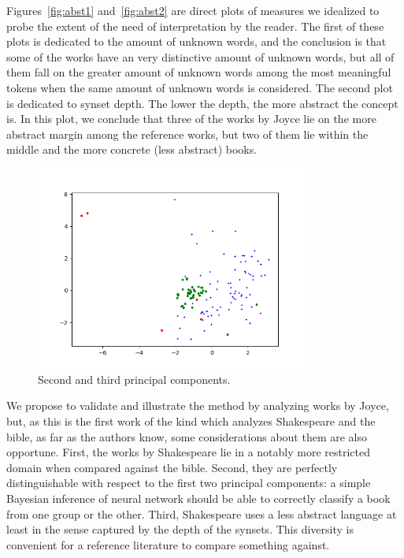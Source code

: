 \documentclass[12pt,fleqn]{article}
\begin{document}
Figures~\ref{fig:abst1} and~\ref{fig:abst2} are direct plots of measures
we idealized to probe the extent of the need of interpretation by the reader.
The first of these plots is dedicated to the amount of unknown words,
and the conclusion is that some of the works have an very distinctive amount
of unknown words, but all of them fall on the greater amount of unknown words
among the most meaningful tokens when the same amount of unknown words is considered.
The second plot is dedicated to synset depth.
The lower the depth, the more abstract the concept is.
In this plot, we conclude that three of the works by Joyce lie on
the more abstract margin among the reference works,
but two of them lie within the middle and the more concrete (less abstract)
books.

\begin{figure}[!htbp] %
\vspace{-2pt}
\begin{center}
\includegraphics[height=6.7cm,width=9cm]{figs/pca3}%
\caption{Second and third principal components.}
\label{fig:pca3}%
\end{center}
\end{figure}

We propose to validate and illustrate the method by analyzing
works by Joyce, but, as this is the first work of the kind which analyzes
Shakespeare and the bible, as far as the authors know,
some considerations about them are also opportune.
First, the works by Shakespeare lie in a notably more restricted domain
when compared against the bible.
Second, they are perfectly distinguishable with respect to the first two
principal components: a simple Bayesian inference of neural network
should be able to correctly classify a book from one group or the other.
Third, Shakespeare uses a less abstract language at least in the sense captured
by the depth of the synsets.
This diversity is convenient for a reference literature to compare something against.
\end{document}
